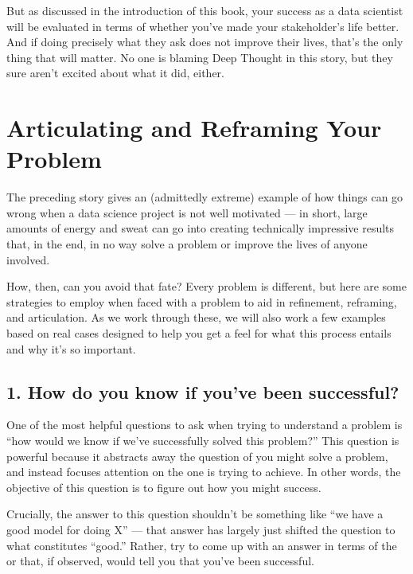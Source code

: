 \documentclass[letterpaper,10pt,english]{jupyterBook}
\begin{document}
\sphinxAtStartPar
But as discussed in the introduction of this book, your success as a data scientist will  be evaluated in terms of whether you’ve made your stakeholder’s life better. And if doing precisely what they ask does not improve their lives, that’s the only thing that will matter. No one is blaming Deep Thought in this story, but they sure aren’t excited about what it did, either.


\section{Articulating and Reframing Your Problem}
\label{\detokenize{20_problems_to_questions/10_solving_the_right_problem:articulating-and-reframing-your-problem}}
\sphinxAtStartPar
The preceding story gives an (admittedly extreme) example of how things can go wrong when a data science project is not well motivated — in short, large amounts of energy and sweat can go into creating technically impressive results that, in the end, in no way solve a problem or improve the lives of anyone involved.

\sphinxAtStartPar
How, then, can you avoid that fate? Every problem is different, but here are some strategies to employ when faced with a problem to aid in refinement, reframing, and articulation. As we work through these, we will also work a few examples based on real cases designed to help you get a feel for what this process entails and why it’s so important.


\subsection{1. How do you know if you’ve been successful?}
\label{\detokenize{20_problems_to_questions/10_solving_the_right_problem:how-do-you-know-if-you-ve-been-successful}}
\sphinxAtStartPar
One of the most helpful questions to ask when trying to understand a problem is “how would we know if we’ve successfully solved this problem?” This question is powerful because it abstracts away the question of  you might solve a problem, and instead focuses attention on the  one is trying to achieve. In other words, the objective of this question is to figure out how you might  success.

\sphinxAtStartPar
Crucially, the answer to this question shouldn’t be something like “we have a good model for doing X” — that answer has largely just shifted the question to what constitutes “good.” Rather, try to come up with an answer in terms of the  or  that, if observed, would tell you that you’ve been successful.
\end{document}
